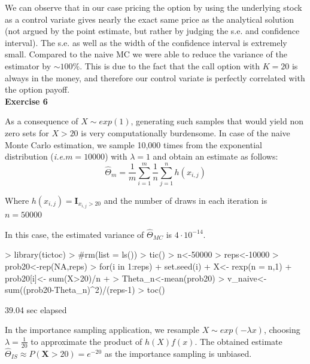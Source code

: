 \documentclass{article}
\begin{document}
We can observe that in our case pricing the option by using the underlying stock as a control variate gives nearly the exact same price as the analytical solution (not argued by the point estimate, but rather by judging the s.e. and confidence interval). The s.e. as well as the width of the confidence interval is extremely small. Compared to the naive MC we were able to reduce the variance of the estimator by $\sim 100\%$. This is due to the fact that the call option with $K=20$ is always in the money, and therefore our control variate is perfectly correlated with the option payoff. \\



\newpage
\textbf{Exercise 6} 


As a consequence of $X \sim exp(1)$, generating such samples that would yield non zero sets for $X>20$ is very computationally burdensome. In case of the naive Monte Carlo estimation, we sample 10,000 times from the exponential distribution (\textit{i.e.}$m=10000$) with $\lambda=1$ and obtain an estimate as follows:
\begin{equation}
\hat{\Theta}_m = \frac{1}{m}\sum_{i=1}^{m}\frac{1}{n}\sum_{j=1}^n h(x_{i,j})
\end{equation}

Where $h(x_{i,j})=\mathbf{I}_{x_{i,j}>20}$ and the number of draws in each iteration is $n=50000$

In this case, the estimated variance of $\hat{\Theta}_{MC}$ is $4\cdot 10^{-14}$.

\begin{Schunk}
\begin{Sinput}
> library(tictoc)
> #rm(list = ls())
> tic()
> n<-50000
> reps<-10000
> prob20<-rep(NA,reps)
> for(i in 1:reps){
+ set.seed(i)
+ X<- rexp(n = n,1)
+ prob20[i]<- sum(X>20)/n
+ }
> Theta_n<-mean(prob20)
> v_naive<-sum((prob20-Theta_n)^2)/(reps-1)
> toc()
\end{Sinput}
\begin{Soutput}
39.04 sec elapsed
\end{Soutput}
\end{Schunk}

In the importance sampling application, we resample $X\sim exp(-\lambda x)$, choosing $\lambda=\frac{1}{20}$ to approximate the product of $h(X)f(x)$. The obtained estimate $\hat{\Theta}_{IS}\approx P(\mathbf{X}>20)=e^{-20}$ as the importance sampling is unbiased.
\end{document}
